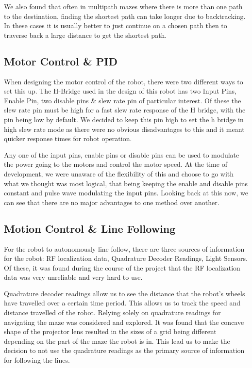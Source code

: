 \documentclass{article}
\begin{document}
We also found that often in multipath mazes where there is more than one path to the destination, finding the shortest path can take longer due to backtracking. In these cases it is usually better to just continue on a chosen path then to traverse back a large distance to get the shortest path.

\subsection{Motor Control \& PID}

When designing the motor control of the robot, there were two different ways to set this up. The H-Bridge used in the design of this robot has two Input Pins, Enable Pin, two disable pins \& slew rate pin of particular interest. Of these the slew rate pin must be high for a fast slew rate response of the H bridge, with the pin being low by default. We decided to keep this pin high to set the h bridge in high slew rate mode as there were no obvious disadvantages to this and it meant quicker response times for robot operation.

Any one of the input pins, enable pins or disable pins can be used to modulate the power going to the motors and control the motor speed. At the time of development, we were unaware of the flexibility of this and choose to go with what we thought was most logical, that being keeping the enable and disable pins constant and pulse wave modulating the input pins. Looking back at this now, we can see that there are no major advantages to one method over another.

\subsection{Motion Control \& Line Following}

For the robot to autonomously line follow, there are three sources of information for the robot: RF localization data, Quadrature Decoder Readings, Light Sensors. Of these, it was found during the course of the project that the RF localization data was very unreliable and very hard to use.

Quadrature decoder readings allow us to see the distance that the robot's wheels have travelled over a certain time period. This allows us to track the speed and distance travelled of the robot. Relying solely on quadrature readings for navigating the maze was considered and explored. It was found that the concave shape of the projector lens resulted in the sizes of a grid being different depending on the part of the maze the robot is in. This lead us to make the decision to not use the quadrature readings as the primary source of information for following the lines.
\end{document}
